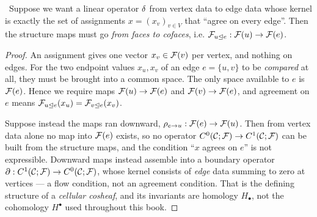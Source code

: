 \begin{center}
\label{fig:direction}
\end{center}

\begin{proposition}\label{prop:direction}
\Proved\ Suppose we want a linear operator $\delta$ from vertex data to
edge data whose kernel is exactly the set of assignments
$x=(x_v)_{v\in V}$ that ``agree on every edge''. Then the structure maps
must go \emph{from faces to cofaces}, i.e.
$\mathcal{F}_{u\trianglelefteq e}:\mathcal{F}(u)\to\mathcal{F}(e)$.
\end{proposition}
\begin{proof}
An assignment gives one vector $x_v\in\mathcal{F}(v)$ per vertex, and nothing
on edges. For the two endpoint values $x_u,x_v$ of an edge $e=\{u,v\}$
to be \emph{compared} at all, they must be brought into a common space.
The only space available to $e$ is $\mathcal{F}(e)$. Hence we require maps
$\mathcal{F}(u)\to\mathcal{F}(e)$ and $\mathcal{F}(v)\to\mathcal{F}(e)$, and agreement on
$e$ means
$\mathcal{F}_{u\trianglelefteq e}(x_u)=\mathcal{F}_{v\trianglelefteq e}(x_v)$.

Suppose instead the maps ran downward,
$\rho_{e\to u}:\mathcal{F}(e)\to\mathcal{F}(u)$. Then from vertex data alone no
map into $\mathcal{F}(e)$ exists, so no operator $C^{0}(\mathcal{C};\mathcal{F})\to C^{1}(\mathcal{C};\mathcal{F})$ can be
built from the structure maps, and the condition ``$x$ agrees on $e$''
is not expressible. Downward maps instead assemble into a boundary
operator $\partial:C^{1}(\mathcal{C};\mathcal{F})\to C^{0}(\mathcal{C};\mathcal{F})$, whose kernel consists of \emph{edge}
data summing to zero at vertices --- a flow condition, not an agreement
condition. That is the defining structure of a \emph{cellular cosheaf},
and its invariants are homology $H_\bullet$, not the cohomology
$H^\bullet$ used throughout this book.
\end{proof}

